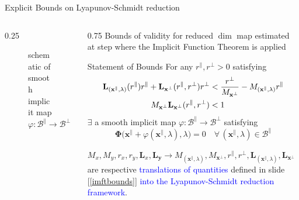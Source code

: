 \documentclass[11pt]{beamer}
\begin{document}
\begin{frame}{Explicit Bounds on Lyapunov-Schmidt reduction}
    \begin{columns}
        \begin{column}{0.25\textwidth}
            \begin{figure}[ht!]
                \centering
                
                \caption{schematic of smooth implicit map \(\varphi:\mathcal{B}^\parallel\to\mathcal{B}^\perp\)}
            \end{figure}
        \end{column}
        \hfill
        \begin{column}{0.75\textwidth}
            Bounds of validity for reduced \(\dim\) map estimated at step where the Implicit Function Theorem is applied
            \begin{block}{Statement of Bounds}
                For any \(r^\parallel,r^\perp>0\) satisfying
                \vspace{-2mm}\[\begin{aligned}
                    \mathbf{L}_{(\mathbf{x}^\parallel,\lambda)}(r^\parallel)r^\parallel+\mathbf{L}_{\mathbf{x}^\perp}(r^\parallel,r^\perp)r^\perp & < \frac{r^\perp}{M_{\mathbf{x}^\perp}}-M_{(\mathbf{x}^\parallel,\lambda)}r^\parallel \\
                    M_{\mathbf{x}^\perp}\mathbf{L}_{\mathbf{x}^\perp}(r^\parallel,r^\perp) & < 1
                \end{aligned}\vspace{-2mm}\]
                \(\exists\) a smooth implicit map \(\varphi:\mathcal{B}^\parallel\to\mathcal{B}^\perp\) satisfying
                \vspace{-2mm}\[
                    \boldsymbol{\Phi}\big(\mathbf{x}^\parallel+\varphi(\mathbf{x}^\parallel,\lambda),\lambda\big) = 0 \quad\forall\,(\mathbf{x}^\parallel,\lambda)\in\mathcal{B}^\parallel
                \]
            \end{block}
            \(
                \boxed{M_x, M_y, r_x, r_y, \mathbf{L}_x, \mathbf{L}_{\mathbf{y}} \to M_{(\mathbf{x}^\parallel,\lambda)}, M_{\mathbf{x}^\perp}, r^\parallel, r^\perp, \mathbf{L}_{(\mathbf{x}^\parallel,\lambda)}, \mathbf{L}_{\mathbf{x}^\perp}}
            \)
            are respective \textcolor{blue}{translations of quantities} defined in slide [\ref{imftbounds}] \textcolor{blue}{into the Lyapunov-Schmidt reduction framework}.
        \end{column}
        \hfill
    \end{columns}
\end{frame}
\end{document}
